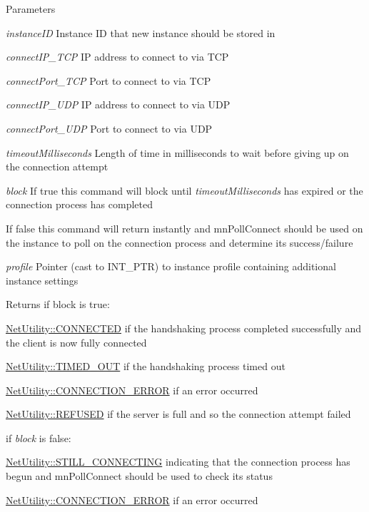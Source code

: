 \begin{DoxyParams}{Parameters}
\item[{\em instanceID}]Instance ID that new instance should be stored in \item[{\em connectIP\_\-TCP}]IP address to connect to via TCP \item[{\em connectPort\_\-TCP}]Port to connect to via TCP \item[{\em connectIP\_\-UDP}]IP address to connect to via UDP \item[{\em connectPort\_\-UDP}]Port to connect to via UDP \item[{\em timeoutMilliseconds}]Length of time in milliseconds to wait before giving up on the connection attempt \item[{\em block}]If true this command will block until {\itshape timeoutMilliseconds\/} has expired or the connection process has completed \par
 If false this command will return instantly and mnPollConnect should be used on the instance to poll on the connection process and determine its success/failure \item[{\em profile}]Pointer (cast to INT\_\-PTR) to instance profile containing additional instance settings\end{DoxyParams}
\begin{DoxyReturn}{Returns}
if block is true: \par
 

\hyperlink{class_net_utility_a7eae52138f8bd597ffc67ebf07e86b6da9c07ac24fb9bdd4157ace978968721fd}{NetUtility::CONNECTED} if the handshaking process completed successfully and the client is now fully connected 

\hyperlink{class_net_utility_a7eae52138f8bd597ffc67ebf07e86b6da319e02f6059b4b08edd70c16fa5206fd}{NetUtility::TIMED\_\-OUT} if the handshaking process timed out 

\hyperlink{class_net_utility_a7eae52138f8bd597ffc67ebf07e86b6da7c6b34544a99c4c264366f2fed4f0973}{NetUtility::CONNECTION\_\-ERROR} if an error occurred 

\hyperlink{class_net_utility_a7eae52138f8bd597ffc67ebf07e86b6dabc894c2de7a4404e353f3bcc1193e90b}{NetUtility::REFUSED} if the server is full and so the connection attempt failed\par
\par


if {\itshape block\/} is false:\par
 

\hyperlink{class_net_utility_a7eae52138f8bd597ffc67ebf07e86b6da86caa623f8ffc60da40df3c2ab17532c}{NetUtility::STILL\_\-CONNECTING} indicating that the connection process has begun and mnPollConnect should be used to check its status 

\hyperlink{class_net_utility_a7eae52138f8bd597ffc67ebf07e86b6da7c6b34544a99c4c264366f2fed4f0973}{NetUtility::CONNECTION\_\-ERROR} if an error occurred 
\end{DoxyReturn}
